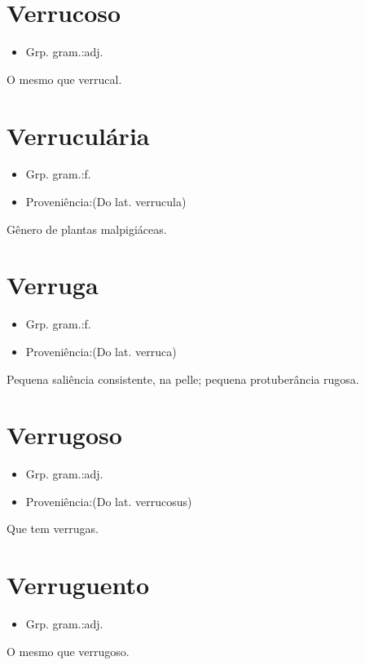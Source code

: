\documentclass{article}
\begin{document}
\section{Verrucoso}
\begin{itemize}
\item {Grp. gram.:adj.}
\end{itemize}
O mesmo que \textunderscore verrucal\textunderscore .
\section{Verruculária}
\begin{itemize}
\item {Grp. gram.:f.}
\end{itemize}
\begin{itemize}
\item {Proveniência:(Do lat. \textunderscore verrucula\textunderscore )}
\end{itemize}
Gênero de plantas malpigiáceas.
\section{Verruga}
\begin{itemize}
\item {Grp. gram.:f.}
\end{itemize}
\begin{itemize}
\item {Proveniência:(Do lat. \textunderscore verruca\textunderscore )}
\end{itemize}
Pequena saliência consistente, na pelle; pequena protuberância rugosa.
\section{Verrugoso}
\begin{itemize}
\item {Grp. gram.:adj.}
\end{itemize}
\begin{itemize}
\item {Proveniência:(Do lat. \textunderscore verrucosus\textunderscore )}
\end{itemize}
Que tem verrugas.
\section{Verruguento}
\begin{itemize}
\item {Grp. gram.:adj.}
\end{itemize}
O mesmo que \textunderscore verrugoso\textunderscore .
\end{document}

